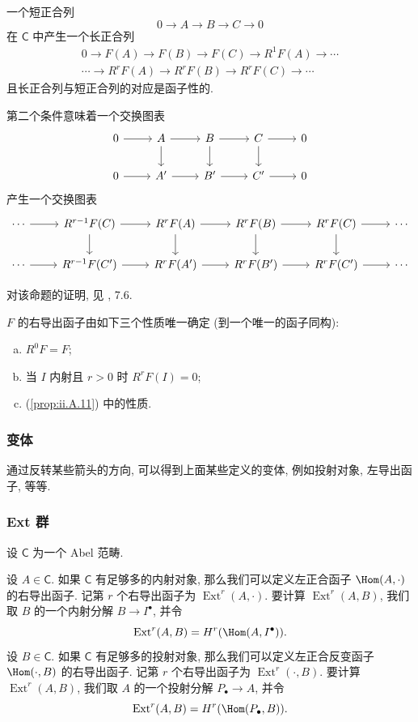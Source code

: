 \begin{proposition}\label{prop:ii.A.11}
一个短正合列
\[
 0\to A\to B\to C\to 0
\]
在 $\mathsf{C}$ 中产生一个长正合列
\begin{align*}
 0\to F(A)\to F(B)\to F(C)\to R^1F(A)\to\cdots\\
 \cdots\to R^rF(A)\to R^rF(B)\to R^rF(C)\to\cdots
 \end{align*}
且长正合列与短正合列的对应是函子性的.
\end{proposition}

第二个条件意味着一个交换图表
\[
 \begin{tikzcd}
 0 \ar[r] & A \ar[r] \ar[d] & B \ar[r] \ar[d] & C \ar[r] \ar[d] & 0 \\
 0 \ar[r] & A' \ar[r] & B' \ar[r] & C' \ar[r] & 0
 \end{tikzcd}
\]
产生一个交换图表
\[
 \begin{tikzcd}
 \cdots \ar[r] & R^{r-1}F(C) \ar[r] \ar[d] & R^rF(A) \ar[r] \ar[d] & R^rF(B) \ar[r] \ar[d] & R^rF(C) \ar[r] \ar[d] & \cdots \\
 \cdots \ar[r] & R^{r-1}F(C') \ar[r] & R^rF(A') \ar[r] & R^rF(B') \ar[r] & R^rF(C') \ar[r] & \cdots
 \end{tikzcd}
\]

对该命题的证明, 见 \cite{BucurDeleanu1968}, 7.6.

\begin{remark}\label{rem:ii.A.12}
$F$ 的右导出函子由如下三个性质唯一确定 (到一个唯一的函子同构):
\begin{enumerate}[(a)]
\item $R^0F=F$;
\item 当 $I$ 内射且 $r>0$ 时 $R^rF(I)=0$;
\item (\ref{prop:ii.A.11}) 中的性质.
\end{enumerate}
\end{remark}

\subsubsection*{变体}

通过反转某些箭头的方向, 可以得到上面某些定义的变体, 例如投射对象, 左导出函子, 等等.

\subsubsection*{Ext 群}

设 $\mathsf{C}$ 为一个 Abel 范畴.

设 $A\in\mathsf{C}$. 如果 $\mathsf{C}$ 有足够多的内射对象, 那么我们可以定义左正合函子 $\Hom(A,\cdot)$ 的右导出函子. 记第 $r$ 个右导出函子为 $\operatorname{Ext}^r(A,\cdot)$. 要计算 $\operatorname{Ext}^r(A,B)$, 我们取 $B$ 的一个内射分解 $B\to I^\bullet$, 并令
\[
 \operatorname{Ext}^r(A,B)=H^r(\Hom(A,I^\bullet)).
\]
设 $B\in\mathsf{C}$. 如果 $\mathsf{C}$ 有足够多的投射对象, 那么我们可以定义左正合反变函子 $\Hom(\cdot,B)$ 的右导出函子. 记第 $r$ 个右导出函子为 $\operatorname{Ext}^r(\cdot,B)$. 要计算 $\operatorname{Ext}^r(A,B)$, 我们取 $A$ 的一个投射分解 $P_\bullet\to A$, 并令
\[
 \operatorname{Ext}^r(A,B)=H^r(\Hom(P_\bullet,B)).
\]


